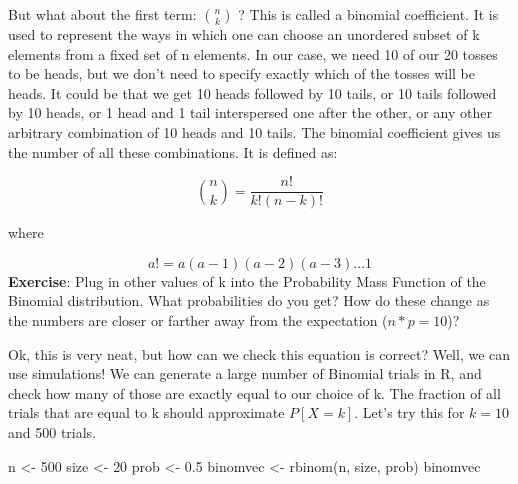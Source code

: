 \documentclass[
]{book}
\newenvironment{Shaded}{\begin{snugshade}}{\end{snugshade}}
\newcommand{\DecValTok}[1]{\textcolor[rgb]{0.00,0.00,0.81}{#1}}
\newcommand{\FloatTok}[1]{\textcolor[rgb]{0.00,0.00,0.81}{#1}}
\newcommand{\FunctionTok}[1]{\textcolor[rgb]{0.00,0.00,0.00}{#1}}
\newcommand{\NormalTok}[1]{#1}
\newcommand{\OtherTok}[1]{\textcolor[rgb]{0.56,0.35,0.01}{#1}}
\begin{document}
But what about the first term: \(n \choose k\) ? This is called a binomial coefficient. It is used to represent the ways in which one can choose an unordered subset of k elements from a fixed set of n elements. In our case, we need 10 of our 20 tosses to be heads, but we don't need to specify exactly which of the tosses will be heads. It could be that we get 10 heads followed by 10 tails, or 10 tails followed by 10 heads, or 1 head and 1 tail interspersed one after the other, or any other arbitrary combination of 10 heads and 10 tails. The binomial coefficient gives us the number of all these combinations. It is defined as:

\[{n \choose k} = \frac{n!}{k!(n-k)!}\]

where

\[a! = a(a-1)(a-2)(a-3) ...1\]
\textbf{Exercise}: Plug in other values of k into the Probability Mass Function of the Binomial distribution. What probabilities do you get? How do these change as the numbers are closer or farther away from the expectation (\(n*p=10\))?

Ok, this is very neat, but how can we check this equation is correct? Well, we can use simulations! We can generate a large number of Binomial trials in R, and check how many of those are exactly equal to our choice of k. The fraction of all trials that are equal to k should approximate \(P[X=k]\). Let's try this for \(k=10\) and 500 trials.

\begin{Shaded}
\begin{Highlighting}[]
\NormalTok{n }\OtherTok{\textless{}{-}} \DecValTok{500}
\NormalTok{size }\OtherTok{\textless{}{-}} \DecValTok{20}
\NormalTok{prob }\OtherTok{\textless{}{-}} \FloatTok{0.5}
\NormalTok{binomvec }\OtherTok{\textless{}{-}} \FunctionTok{rbinom}\NormalTok{(n, size, prob)}
\NormalTok{binomvec}
\end{Highlighting}
\end{Shaded}
\end{document}
